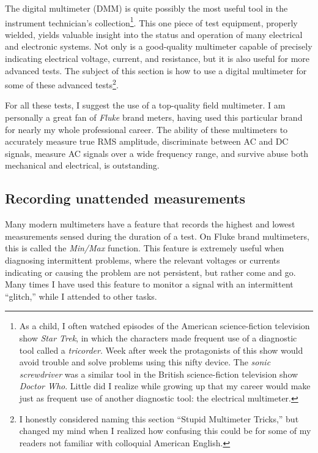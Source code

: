 The digital multimeter (DMM) is quite possibly the most useful tool in the instrument technician's collection\footnote{As a child, I often watched episodes of the American science-fiction television show \textit{Star Trek}, in which the characters made frequent use of a diagnostic tool called a \textit{tricorder}.  Week after week the protagonists of this show would avoid trouble and solve problems using this nifty device.  The \textit{sonic screwdriver} was a similar tool in the British science-fiction television show \textit{Doctor Who}.  Little did I realize while growing up that my career would make just as frequent use of another diagnostic tool: the electrical multimeter.}.  This one piece of test equipment, properly wielded, yields valuable insight into the status and operation of many electrical and electronic systems.  Not only is a good-quality multimeter capable of precisely indicating electrical voltage, current, and resistance, but it is also useful for more advanced tests.  The subject of this section is how to use a digital multimeter for some of these advanced tests\footnote{I honestly considered naming this section ``Stupid Multimeter Tricks,'' but changed my mind when I realized how confusing this could be for some of my readers not familiar with colloquial American English.}.    

For all these tests, I suggest the use of a top-quality field multimeter.  I am personally a great fan of \textit{Fluke} brand meters, having used this particular brand for nearly my whole professional career.  The ability of these multimeters to accurately measure true RMS amplitude, discriminate between AC and DC signals, measure AC signals over a wide frequency range, and survive abuse both mechanical and electrical, is outstanding.  








\filbreak
\subsection{Recording unattended measurements}

Many modern multimeters have a feature that records the highest and lowest measurements sensed during the duration of a test.  On Fluke brand multimeters, this is called the \textit{Min/Max} function.  This feature is extremely useful when diagnosing intermittent problems, where the relevant voltages or currents indicating or causing the problem are not persistent, but rather come and go.  Many times I have used this feature to monitor a signal with an intermittent ``glitch,'' while I attended to other tasks.

